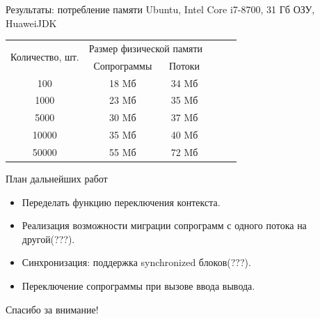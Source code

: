 \begin{frame}{Результаты: потребление памяти}
	Ubuntu, Intel Core i7-8700, 31 Гб ОЗУ, HuaweiJDK
	\begin{table}[H]
		\begin{tabular}{|c|c|c|c|c|c|}
			\hline \multirow{2}{*}{Количество, шт.} & \multicolumn{2}{|c|}{Размер физической памяти}  \\
			\cline{2-3}    & Сопрограммы  & Потоки   \\
			\hline 100     & 18 Mб         & 34 Mб     \\
			\hline 1000    & 23 Mб         & 35 Mб     \\
			\hline 5000    & 30 Mб         & 37 Mб     \\
			\hline 10000   & 35 Mб         & 40 Mб     \\
			\hline 50000   & 55 Mб         & 72 Mб     \\ 
			\hline 
		\end{tabular}
	\end{table}
\end{frame}

\begin{frame}{План дальнейших работ} 
	\begin{itemize}
		\item Переделать функцию переключения контекста.
		\item Реализация возможности миграции сопрограмм с одного потока на другой(???).
		\item Синхронизация: поддержка synchronized блоков(???).
		\item Переключение сопрограммы при вызове ввода вывода.
	\end{itemize}
\end{frame}

\begin{frame}
	\begin{center}
		Спасибо за внимание!
	\end{center}
\end{frame}

